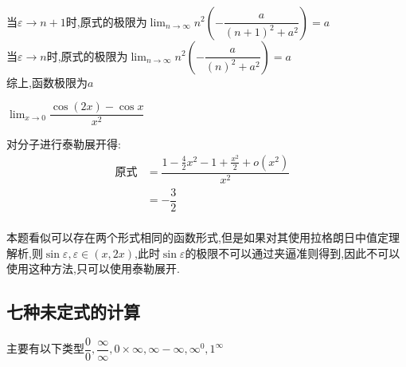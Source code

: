 \documentclass[8pt a4paper, oneside, UTF8]{ctexbook}
\begin{document}
\begin{sloppypar}
\begin{solution}
\begin{align*}
        \end{align*}
        当$\varepsilon \to n+1$时,原式的极限为$\lim_{n\to \infty} n^2(-\dfrac{a}{(n+1)^2+a^2})=a$\\
        当$\varepsilon \to n$时,原式的极限为$\lim_{n\to \infty}n^2(-\dfrac{a}{(n)^2+a^2})=a$\\
        综上,函数极限为$a$
    \end{solution}
    \begin{problem}
        $\lim_{x\to 0}\dfrac{\cos(2x)-\cos x}{x^2}$
    \end{problem}
    \begin{solution}
        对分子进行泰勒展开得:
        \begin{align*}
            \text{原式} & = \dfrac{1-\frac{4}{2}x^2-1+\frac{x^2}{2}+o(x^2)}{x^2} & \\
            & = -\dfrac{3}{2} & \\
        \end{align*}
    \end{solution}
    \begin{note}
        本题看似可以存在两个形式相同的函数形式,但是如果对其使用拉格朗日中值定理解析,则$\sin \varepsilon,\varepsilon \in (x,2x)$,此时$\sin \varepsilon$的极限不可以通过夹逼准则得到,因此不可以使用这种方法,只可以使用泰勒展开.
    \end{note}
    \subsection{七种未定式的计算}
    主要有以下类型$\dfrac{0}{0},\dfrac{\infty}{\infty},0 \times \infty,\infty -\infty,\infty ^0,1^\infty$

\end{sloppypar}
\end{document}
